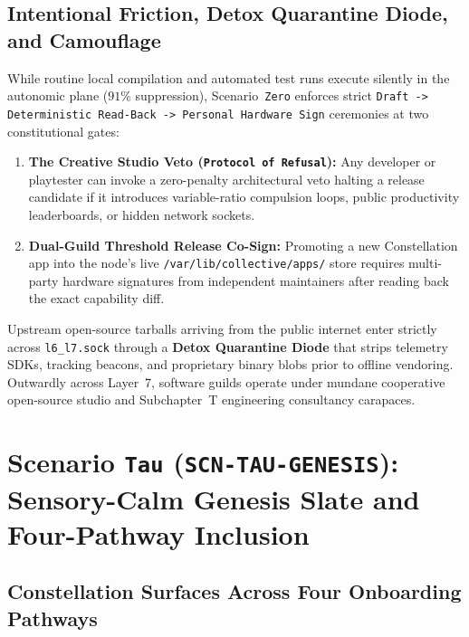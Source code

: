 \subsection{Intentional Friction, Detox Quarantine Diode, and Camouflage}

While routine local compilation and automated test runs execute silently in the autonomic plane ($91\%$ suppression), Scenario~\texttt{Zero} enforces strict \texttt{Draft -> Deterministic Read-Back -> Personal Hardware Sign} ceremonies at two constitutional gates:
\begin{enumerate}
    \item \textbf{The Creative Studio Veto (\texttt{Protocol of Refusal}):} Any developer or playtester can invoke a zero-penalty architectural veto halting a release candidate if it introduces variable-ratio compulsion loops, public productivity leaderboards, or hidden network sockets.
    \item \textbf{Dual-Guild Threshold Release Co-Sign:} Promoting a new Constellation app into the node's live \texttt{/var/lib/collective/apps/} store requires multi-party hardware signatures from independent maintainers after reading back the exact capability diff.
\end{enumerate}
Upstream open-source tarballs arriving from the public internet enter strictly across \texttt{l6\_l7.sock} through a \textbf{Detox Quarantine Diode} that strips telemetry SDKs, tracking beacons, and proprietary binary blobs prior to offline vendoring. Outwardly across Layer~7, software guilds operate under mundane cooperative open-source studio and Subchapter~T engineering consultancy carapaces.

\section{Scenario \texttt{Tau} (\texttt{SCN-TAU-GENESIS}): Sensory-Calm Genesis Slate and Four-Pathway Inclusion}
\label{sec:wave-a-tau}

\subsection{Constellation Surfaces Across Four Onboarding Pathways}

